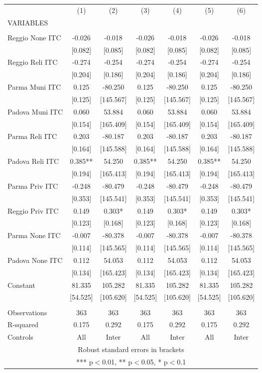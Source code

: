 \begin{tabular}{lcccccc} \hline
 & (1) & (2) & (3) & (4) & (5) & (6) \\
VARIABLES &  &  &  &  &  &  \\ \hline
 &  &  &  &  &  &  \\
Reggio None ITC & -0.026 & -0.018 & -0.026 & -0.018 & -0.026 & -0.018 \\
 & [0.082] & [0.085] & [0.082] & [0.085] & [0.082] & [0.085] \\
Reggio Reli ITC & -0.274 & -0.254 & -0.274 & -0.254 & -0.274 & -0.254 \\
 & [0.204] & [0.186] & [0.204] & [0.186] & [0.204] & [0.186] \\
Parma Muni ITC & 0.125 & -80.250 & 0.125 & -80.250 & 0.125 & -80.250 \\
 & [0.125] & [145.567] & [0.125] & [145.567] & [0.125] & [145.567] \\
Padova Muni ITC & 0.060 & 53.884 & 0.060 & 53.884 & 0.060 & 53.884 \\
 & [0.154] & [165.409] & [0.154] & [165.409] & [0.154] & [165.409] \\
Parma Reli ITC & 0.203 & -80.187 & 0.203 & -80.187 & 0.203 & -80.187 \\
 & [0.164] & [145.588] & [0.164] & [145.588] & [0.164] & [145.588] \\
Padova Reli ITC & 0.385** & 54.250 & 0.385** & 54.250 & 0.385** & 54.250 \\
 & [0.194] & [165.413] & [0.194] & [165.413] & [0.194] & [165.413] \\
Parma Priv ITC & -0.248 & -80.479 & -0.248 & -80.479 & -0.248 & -80.479 \\
 & [0.353] & [145.541] & [0.353] & [145.541] & [0.353] & [145.541] \\
Reggio Priv ITC & 0.149 & 0.303* & 0.149 & 0.303* & 0.149 & 0.303* \\
 & [0.123] & [0.168] & [0.123] & [0.168] & [0.123] & [0.168] \\
Parma None ITC & -0.007 & -80.378 & -0.007 & -80.378 & -0.007 & -80.378 \\
 & [0.114] & [145.565] & [0.114] & [145.565] & [0.114] & [145.565] \\
Padova None ITC & 0.112 & 54.053 & 0.112 & 54.053 & 0.112 & 54.053 \\
 & [0.134] & [165.423] & [0.134] & [165.423] & [0.134] & [165.423] \\
Constant & 81.335 & 105.282 & 81.335 & 105.282 & 81.335 & 105.282 \\
 & [54.525] & [105.620] & [54.525] & [105.620] & [54.525] & [105.620] \\
 &  &  &  &  &  &  \\
Observations & 363 & 363 & 363 & 363 & 363 & 363 \\
R-squared & 0.175 & 0.292 & 0.175 & 0.292 & 0.175 & 0.292 \\
 Controls & All & Inter & All & Inter & All & Inter \\ \hline
\multicolumn{7}{c}{ Robust standard errors in brackets} \\
\multicolumn{7}{c}{ *** p$<$0.01, ** p$<$0.05, * p$<$0.1} \\
\end{tabular}
